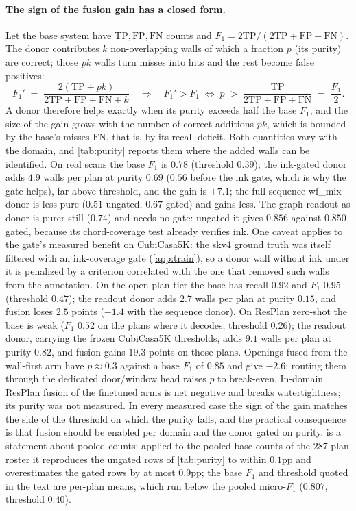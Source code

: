 \documentclass{article}
\begin{document}
\paragraph{The sign of the fusion gain has a closed form.}
Let the base system have $\mathrm{TP},\mathrm{FP},\mathrm{FN}$ counts and
$F_1=2\mathrm{TP}/(2\mathrm{TP}+\mathrm{FP}+\mathrm{FN})$. The donor contributes
$k$ non-overlapping walls of which a fraction $p$ (its purity) are correct;
those $pk$ walls turn misses into hits and the rest become false positives:
\begin{equation}
  F_1' \;=\; \frac{2(\mathrm{TP}+pk)}{2\mathrm{TP}+\mathrm{FP}+\mathrm{FN}+k}
  \quad\Longrightarrow\quad
  F_1' > F_1 \;\iff\; p \;>\; \frac{\mathrm{TP}}{2\mathrm{TP}+\mathrm{FP}+\mathrm{FN}}
  \;=\; \frac{F_1}{2}.
  \label{eq:fusion}
\end{equation}
A donor therefore helps exactly when its purity exceeds half the base $F_1$,
and the size of the gain grows with the number of correct additions $pk$,
which is bounded by the base's misses $\mathrm{FN}$, that is, by its recall
deficit. Both quantities vary with the domain, and \cref{tab:purity} reports
them where the added walls can be identified. On real scans the base $F_1$ is
$0.78$ (threshold $0.39$); the ink-gated donor adds $4.9$ walls per plan at
purity $0.69$ ($0.56$ before the ink gate, which is why the gate helps), far
above threshold, and the gain is $+7.1$; the full-sequence wf\_mix donor is
less pure ($0.51$ ungated, $0.67$ gated) and gains less. The graph readout as
donor is purer still ($0.74$) and needs no gate: ungated it gives $0.856$
against $0.850$ gated, because its chord-coverage test already verifies ink.
One caveat applies to the gate's measured benefit on CubiCasa5K: the skv4
ground truth was itself filtered with an ink-coverage gate
(\cref{app:train}), so a donor wall without ink under it is penalized by a
criterion correlated with the one that removed such walls from the
annotation. On the open-plan tier the base has
recall $0.92$ and $F_1$ $0.95$ (threshold $0.47$); the readout donor adds
$2.7$ walls per plan at purity $0.15$, and fusion loses $2.5$ points ($-1.4$
with the sequence donor). On ResPlan zero-shot the base is weak ($F_1$ $0.52$ on the plans where it
decodes, threshold $0.26$); the readout donor, carrying the frozen CubiCasa5K
thresholds, adds $9.1$ walls per plan at purity $0.82$, and fusion gains
$19.3$ points on those plans.
Openings fused from the wall-first arm have $p\approx0.3$ against a base $F_1$
of $0.85$ and give $-2.6$; routing them through the dedicated door/window head
raises $p$ to break-even. In-domain ResPlan fusion of the finetuned arms is net
negative and breaks watertightness; its purity was not measured. In every
measured case the sign of the gain matches the side of the threshold on which
the purity falls, and the practical consequence is that fusion should be enabled per domain and the donor gated on purity. 
is a statement about pooled counts: applied to the pooled base counts of the
$287$-plan roster it reproduces the ungated rows of \cref{tab:purity} to
within $0.1$pp and overestimates the gated rows by at most $0.9$pp; the base
$F_1$ and threshold quoted in the text are per-plan means, which run below
the pooled micro-$F_1$ ($0.807$, threshold $0.40$).
\end{document}
